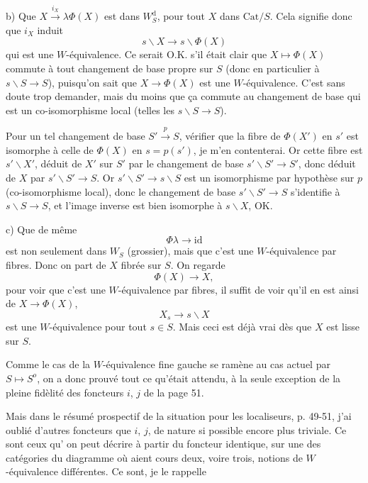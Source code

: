 \documentclass[11pt]{article}
\newcommand{\printedpage}[1]{\marginpar{\footnotesize p.~#1}}
\newcommand{\msp}[1]{\marginpar{\footnotesize [#1]}}
\begin{document}
b) Que $X \xrightarrow{i_X} \lambda\Phi(X)$ est dans $W_S^{\mathrm{d}}$, pour tout $X$ dans $\mathrm{Cat}/S$. Cela signifie donc que $i_X$ induit
\[s\backslash X \longrightarrow s\backslash\Phi(X)\]
qui est une $W$-équivalence. Ce serait O.K. s'il était clair que $X \longmapsto \Phi(X)$ commute à tout changement de base propre sur $S$ (donc en particulier à $s\backslash S \longrightarrow S$), puisqu'on sait que $X \longrightarrow \Phi(X)$ est une $W$-équivalence. C'est sans doute trop demander, mais du moins que ça commute au changement de base qui est un co-isomorphisme local (telles les $s\backslash S \longrightarrow S$).

Pour un tel changement de base $S' \xrightarrow{p} S$, vérifier que la fibre de $\Phi(X')$ en $s'$ est isomorphe à celle de $\Phi(X)$ en $s = p(s')$, je m'en contenterai. Or cette fibre est $s'\backslash X'$, déduit de $X'$ sur $S'$ par le changement de base $s'\backslash S' \longrightarrow S'$, donc déduit de $X$ par $s'\backslash S' \longrightarrow S$. Or $s'\backslash S' \longrightarrow s\backslash S$ est un isomorphisme par hypothèse
\printedpage{37}
\msp{page 60}
sur $p$ (co-isomorphisme local), donc le changement de base $s'\backslash S' \longrightarrow S$ s'identifie à $s\backslash S \longrightarrow S$, et l'image inverse est bien isomorphe à $s\backslash X$, OK.

c) Que de même
\[\Phi\lambda \longrightarrow \mathrm{id}\]
est non seulement dans $W_S$ (grossier), mais que c'est une $W$-équivalence par fibres. Donc on part de $X$ fibrée sur $S$. On regarde
\[\Phi(X) \longrightarrow X,\]
pour voir que c'est une $W$-équivalence par fibres, il suffit de voir qu'il en est ainsi de $X \longrightarrow \Phi(X)$,
\[X_s \longrightarrow s\backslash X\]
est une $W$-équivalence pour tout $s \in S$. Mais ceci est déjà vrai dès que $X$ est lisse sur $S$.

Comme le cas de la $W$-équivalence fine gauche se ramène au cas actuel par $S \longmapsto S^{o}$, on a donc prouvé tout ce qu'était attendu, à la seule exception de la pleine fidèlité des foncteurs $i$, $j$ de la page 51. %

Mais dans le résumé prospectif de la situation pour les localiseurs, p. 49-51, j'ai oublié d'autres foncteurs que $i$, $j$, de nature si possible encore plus triviale. Ce sont
\msp{page 61}
ceux qu' on peut décrire à partir du foncteur identique, sur une des catégories du diagramme où aient cours deux, voire trois, notions de $W$-équivalence différentes. Ce sont, je le rappelle
\end{document}

